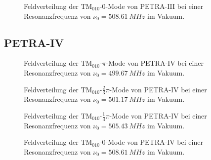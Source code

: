 \begin{figure}[p]
  \centering
  
  \caption[Feldverteilung der $\mathrm{TM}_{010}\text{-}0$-Mode von PETRA-III]{Feldverteilung der $\mathrm{TM}_{010}\text{-}0$-Mode von PETRA-III bei einer Resonanzfrequenz von \mbox{$\nu_0 = \SI{508.61}{MHz}$} im Vakuum.}
\end{figure}
\FloatBarrier

\clearpage
\subsection{PETRA-IV}
\FloatBarrier
\begin{figure}[h]
  \centering
  
  \caption[Feldverteilung der $\mathrm{TM}_{010}\text{-}\pi$-Mode von PETRA-IV]{Feldverteilung der $\mathrm{TM}_{010}\text{-}\pi$-Mode von PETRA-IV bei einer Resonanzfrequenz von \mbox{$\nu_0 = \SI{499.67}{MHz}$} im Vakuum.}
\end{figure}

\begin{figure}[p]
	\centering
  
	
	\caption[Feldverteilung der $\mathrm{TM}_{010}\text{-}\frac{2}{3}\pi$-Mode von PETRA-IV]{Feldverteilung der $\mathrm{TM}_{010}\text{-}\frac{2}{3}\pi$-Mode von PETRA-IV bei einer Resonanzfrequenz von \mbox{$\nu_0 = \SI{501.17}{MHz}$} im Vakuum.}
	
    
    \caption[Feldverteilung der $\mathrm{TM}_{010}\text{-}\frac{1}{3}\pi$-Mode von PETRA-IV]{Feldverteilung der $\mathrm{TM}_{010}\text{-}\frac{1}{3}\pi$-Mode von PETRA-IV bei einer Resonanzfrequenz von \mbox{$\nu_0 = \SI{505.43}{MHz}$} im Vakuum.}
\end{figure}

\begin{figure}[h]
  \centering
  
  \caption[Feldverteilung der $\mathrm{TM}_{010}\text{-}0$-Mode von PETRA-IV]{Feldverteilung der $\mathrm{TM}_{010}\text{-}0$-Mode von PETRA-IV bei einer Resonanzfrequenz von \mbox{$\nu_0 = \SI{508.61}{MHz}$} im Vakuum.}
\end{figure}
\FloatBarrier

\clearpage
